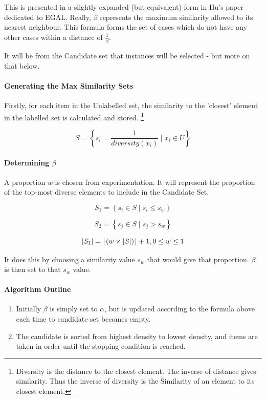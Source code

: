 \documentclass[a4paper,11pt]{report}
\begin{document}
This is presented in a slightly expanded (but equivalent) form in Hu's paper dedicated to EGAL\cite{Hu2010}. Really, $\beta$ represents the maximum similarity allowed to its nearest neighbour. This formula forms the set of cases which do not have any other cases within a distance of $\frac{1}{\beta}$.

It will be from the Candidate set that instances will be selected - but more on that below.

\paragraph{Generating the Max Similarity Sets}

Firstly, for each item in the Unlabelled set, the similarity to the 'closest' element in the labelled set is calculated and stored. \footnote{Diversity is the distance to the closest element. The inverse of distance gives similarity. Thus the inverse of diversity is the Similarity of an element to its closest element.}

\[
S=\left\{ s_{i}=\frac{1}{diversity(x_{i})}\mid x_{i}\in U\right\} 
\]

\paragraph{Determining $\beta$}
A proportion $w$ is chosen from experimentation. It will represent the proportion of the top-most diverse elements to include in the Candidate Set.

\[
S_{1}=\left\{ s_{i}\in S\mid s_{i}\leq s_{w}\right\} 
\]

\[
S_{2}=\left\{ s_{j}\in S\mid s_{j}>s_{w}\right\} 
\]

\[
\left|S_{1}\right|=\left\lfloor \left(w\times\left|S\right|\right)\right\rfloor +1,\hphantom{}0\leq w\leq 1
\]

It does this by choosing a similarity value $s_{w}$ that would give that proportion. $\beta$ is then set to that $s_{w}$ value.

\paragraph{Algorithm Outline}
\begin{enumerate}
	\item Initially $\beta$ is simply set to $\alpha$, but is updated according to the formula above each time to candidate set becomes empty.
	\item The candidate is sorted from highest density to lowest density, and items are taken in order until the stopping condition is reached.
\end{enumerate}
\end{document}
